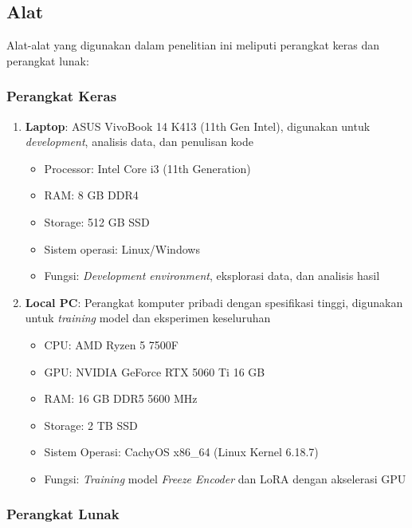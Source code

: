 \subsection{Alat}
\label{III.Alat}

Alat-alat yang digunakan dalam penelitian ini meliputi perangkat keras dan perangkat lunak:

\subsubsection{Perangkat Keras}

\begin{enumerate}[noitemsep]
    \item \textbf{Laptop}: ASUS VivoBook 14 K413 (11th Gen Intel), digunakan untuk \textit{development}, analisis data, dan penulisan kode
    \begin{itemize}[noitemsep]
        \item Processor: Intel Core i3 (11th Generation)
        \item RAM: 8 GB DDR4
        \item Storage: 512 GB SSD
        \item Sistem operasi: Linux/Windows
        \item Fungsi: \textit{Development environment}, eksplorasi data, dan analisis hasil
    \end{itemize}
    \item \textbf{Local PC}: Perangkat komputer pribadi dengan spesifikasi tinggi, digunakan untuk \textit{training} model dan eksperimen keseluruhan
    \begin{itemize}[noitemsep]
        \item CPU: AMD Ryzen 5 7500F
        \item GPU: NVIDIA GeForce RTX 5060 Ti 16 GB
        \item RAM: 16 GB DDR5 5600 MHz
        \item Storage: 2 TB SSD
        \item Sistem Operasi: CachyOS x86\_64 (Linux Kernel 6.18.7)
        \item Fungsi: \textit{Training} model \textit{Freeze Encoder} dan LoRA dengan akselerasi GPU
    \end{itemize}
\end{enumerate}

\subsubsection{Perangkat Lunak}


